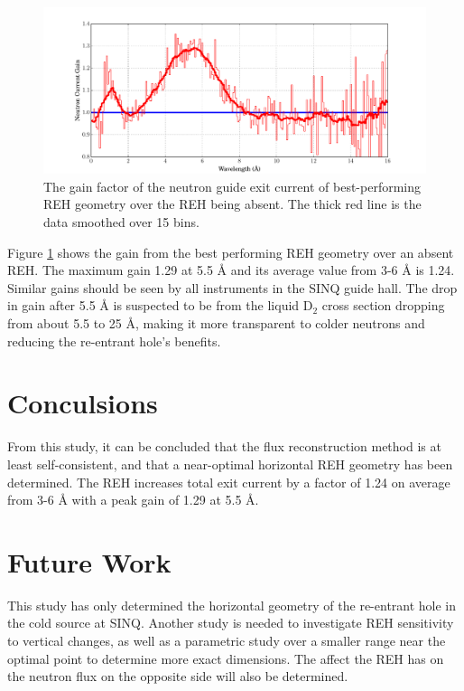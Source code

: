 \documentclass[a4paper]{jpconf}
\begin{document}
\begin{figure}
\begin{center}
\includegraphics[scale=0.38,trim={0cm 0cm 0cm 0cm},clip]{graphics/parametric_gain.pdf}
\end{center}
\caption{\label{parametric_gain}The gain factor of the neutron guide exit current of best-performing REH geometry over the REH being absent.  The thick red line is the data smoothed over 15 bins.}
\end{figure}


Figure \ref{parametric_gain} shows the gain from the best performing REH geometry over an absent REH.  The maximum gain 1.29 at 5.5 \AA{} and its average value from 3-6 \AA{} is 1.24.  Similar gains should be seen by all instruments in the SINQ guide hall.  The drop in gain after 5.5 \AA{} is suspected to be from the liquid D$_2$ cross section dropping from about 5.5 to 25 \AA{}, making it more transparent to colder neutrons and reducing the re-entrant hole's benefits.


\section{Conculsions}

From this study, it can be concluded that the flux reconstruction method is at least self-consistent, and that a near-optimal horizontal REH geometry has been determined.  The REH increases total exit current by a factor of 1.24 on average from 3-6 \AA{} with a peak gain of 1.29 at 5.5 \AA{}.

\section{Future Work}

This study has only determined the horizontal geometry of the re-entrant hole in the cold source at SINQ.  Another study is needed to investigate REH sensitivity to vertical changes, as well as a parametric study over a smaller range near the optimal point to determine more exact dimensions.  The affect the REH has on the neutron flux on the opposite side will also be determined.
\end{document}
